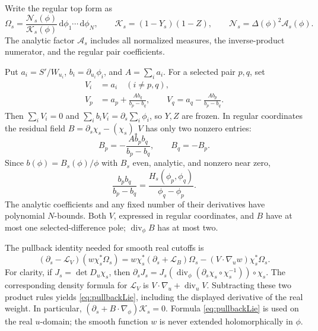 \documentclass[11pt]{article}
\numberwithin{equation}{section}
\theoremstyle{definition}
\newcommand{\dd}{\,\mathrm d}
\newcommand{\Li}{\mathcal L}
\begin{document}
Write the regular top form as
\[
 \Omega_s=
  \frac{\mathscr N_s(\phi)}{\mathcal K_s(\phi)}
       \dd\phi_1\cdots\dd\phi_N,\qquad
 \mathcal K_s=(1-Y_s)(1-Z),\qquad
 \mathscr N_s=\Delta(\phi)^2\mathscr A_s(\phi).
\]
The analytic factor \(\mathscr A_s\) includes all normalized measures,
the inverse-product numerator, and the regular pair coefficients.

Put \(a_i=S'/W_{u_i}\), \(b_i=\partial_{u_i}\phi_i\), and
\(A=\sum_i a_i\). For a selected pair \(p,q\), set
\begin{equation}
 \begin{split}
 V_i&=a_i\quad(i\ne p,q),\\
 V_p&=a_p+\frac{Ab_q}{b_p-b_q},\qquad
 V_q=a_q-\frac{Ab_p}{b_p-b_q}.
 \end{split}\label{eq:twofield}
\end{equation}
Then \(\sum_iV_i=0\) and
\(\sum_i b_iV_i=\partial_s\sum_i\phi_i\), so \(Y,Z\) are frozen.
In regular coordinates the residual field
\(B=\partial_s\chi_s-(\chi_s)_*V\) has only two nonzero entries:
\[
 B_p=-\frac{Ab_pb_q}{b_p-b_q},\qquad B_q=-B_p.
\]
Since \(b(\phi)=B_s(\phi)/\phi\) with \(B_s\) even, analytic, and
nonzero near zero,
\[
 \frac{b_pb_q}{b_p-b_q}
     =\frac{H_s(\phi_p,\phi_q)}{\phi_q-\phi_p}.
\]
The analytic coefficients and any fixed number of their derivatives
have polynomial \(N\)-bounds. Both \(V\), expressed in regular
coordinates, and \(B\) have at most one selected-difference pole;
\(\operatorname{div}_\phi B\) has at most two.

The pullback identity needed for smooth real cutoffs is
\begin{equation}
 (\partial_s-\Li_V)(w\chi_s^*\Omega_s)
  =w\chi_s^*(\partial_s+\Li_B)\Omega_s
       -(V\cdot\nabla_u w)\chi_s^*\Omega_s.
 \label{eq:pullbackLie}
\end{equation}
For clarity, if \(J_s=\det D_u\chi_s\), then
\(\partial_sJ_s=J_s(\operatorname{div}_\phi
(\partial_s\chi_s\circ\chi_s^{-1}))\circ\chi_s\).
The corresponding density formula for \(\mathcal L_V\) is
\(V\cdot\nabla_u+\operatorname{div}_uV\).
Subtracting these two product rules yields \eqref{eq:pullbackLie},
including the displayed derivative of the real weight. In particular,
\((\partial_s+B\cdot\nabla_\phi)\mathcal K_s=0\).
Formula \eqref{eq:pullbackLie} is used on the real \(u\)-domain;
the smooth function \(w\) is never extended holomorphically in \(\phi\).
\end{document}
